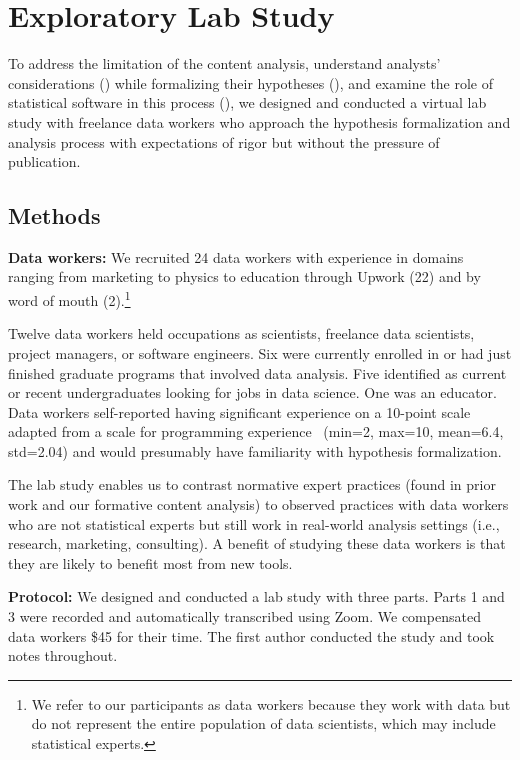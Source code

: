 \section{Exploratory Lab Study} \label{sec:inLabStudy}

To address the limitation of the content analysis, understand analysts'
considerations (\rqProcess) while formalizing their hypotheses (\rqSteps), and
examine the role of statistical software in this process (\rqTools), we designed
and conducted a virtual lab study with freelance data workers who approach the
hypothesis formalization and analysis process with expectations of rigor but
without the pressure of publication.

\subsection{Methods} 
\textbf{Data workers:} We recruited 24 data workers with experience in domains
ranging from marketing to physics to education through Upwork (22) and by
word of mouth (2).\footnote{We refer to our participants as data workers because they work with data but do not represent the entire population of data scientists, which may include statistical experts.}

Twelve data workers held occupations as scientists, freelance data scientists,
project managers, or software engineers. Six were currently enrolled in or had just
finished graduate programs that involved data analysis. Five identified as
current or recent undergraduates looking for jobs in data science. One was an
educator. Data workers self-reported having significant experience on a 10-point
scale adapted from a scale for programming experience~\cite{feigenspan2012measuring} (min=2, max=10, mean=6.4,
std=2.04) and would presumably have familiarity with hypothesis formalization.

The lab study enables us to contrast normative expert practices (found in 
prior work and our formative content analysis) to observed practices with data
workers who are not statistical experts but still work in real-world analysis
settings (i.e., research, marketing, consulting). A benefit of studying these
data workers is that they are likely to benefit most from new tools. 


\noindent\textbf{Protocol:} %
We designed
and conducted a lab study with three parts. Parts 1 and 3 were recorded and automatically transcribed using Zoom. We compensated data workers \$45 for
their time. The first author conducted the study and took notes throughout.

